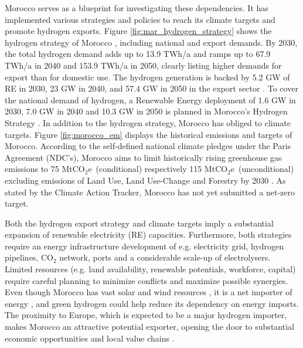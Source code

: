 \documentclass[5p,numafflabel]{elsarticle}
\def\coe{CO${}_2$e}
\begin{document}
Morocco serves as a blueprint for investigating these dependencies. It has implemented various strategies and policies to reach its climate targets and promote hydrogen exports. Figure \ref{fig:mar_hydrogen_strategy} shows the hydrogen strategy of Morocco \cite{MarHyStrat2021}, including national and export demands. By 2030, the total hydrogen demand adds up to 13.9 TWh/a and ramps up to 67.9 TWh/a in 2040 and 153.9 TWh/a in 2050, clearly listing higher demands for export than for domestic use. The hydrogen generation is backed by 5.2 GW of RE in 2030, 23 GW in 2040, and 57.4 GW in 2050 in the export sector \cite{MarHyStrat2021}. To cover the national demand of hydrogen, a Renewable Energy deployment of 1.6 GW in 2030, 7.0 GW in 2040 and 10.3 GW in 2050 is planned in Morocco's Hydrogen Strategy \cite{MarHyStrat2021}. In addition to the hydrogen strategy, Morocco has obliged to climate targets. Figure \ref{fig:morocco_em} displays the historical emissions and targets of Morocco.
According to the self-defined national climate pledges under the Paris Agreement (NDC's), Morocco aims to limit historically rising greenhouse gas emissions to 75 Mt\coe\ (conditional) respectively 115 Mt\coe\ (unconditional) excluding emissions of Land Use, Land Use-Change and Forestry by 2030 \cite{CAT2021}. 
As stated by the Climate Action Tracker\cite{CAT2021}, Morocco has not yet submitted a net-zero target. 

Both the hydrogen export strategy and climate targets imply a substantial expansion of renewable electricity (RE) capacities. Furthermore, both strategies require an energy infrastructure development of e.g. electricity grid, hydrogen pipelines, $\mathrm{CO_2}$ network, ports and a considerable scale-up of electrolysers.
Limited resources (e.g. land availability, renewable potentials, workforce, capital) require careful planning to minimize conflicts and maximize possible synergies. Even though Morocco has vast solar and wind resources \cite{Peters2023, Touili2018, Sterl2022}, it is a net importer of energy \cite{IEA2022}, and green hydrogen could help reduce its dependency on energy imports. The proximity to Europe, which is expected to be a major hydrogen importer, makes Morocco an attractive potential exporter, opening the door to substantial economic opportunities and local value chains \cite{Ersoy2022}.
\end{document}
